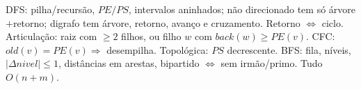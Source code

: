 \begin{chave}
DFS: pilha/recursão, $PE/PS$, intervalos aninhados; não direcionado tem só árvore$+$retorno; digrafo tem árvore, retorno, avanço e cruzamento. Retorno $\iff$ ciclo. Articulação: raiz com $\ge2$ filhos, ou filho $w$ com $back(w)\ge PE(v)$. CFC: $old(v)=PE(v)\Rightarrow$ desempilha. Topológica: $PS$ decrescente. BFS: fila, níveis, $|\Delta nivel|\le1$, distâncias em arestas, bipartido $\iff$ sem irmão/primo. Tudo $O(n+m)$.
\end{chave}
